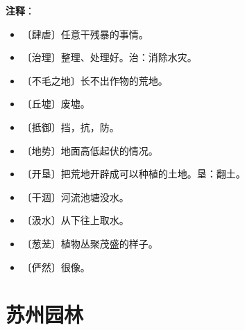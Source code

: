 \documentclass[12pt,UTF-8,openany]{ctexbook}
\begin{document}
\newpage

\textbf{注释}：

\vspace{-1em}

\begin{itemize}
    \setlength\itemsep{-0.2em}
    \item 〔肆虐〕任意干残暴的事情。
    \item 〔治理〕整理、处理好。治：消除水灾。
    \item 〔不毛之地〕长不出作物的荒地。
    \item 〔丘墟〕废墟。
    \item 〔抵御〕挡，抗，防。
    \item 〔地势〕地面高低起伏的情况。
    \item 〔开垦〕把荒地开辟成可以种植的土地。垦：翻土。
    \item 〔干涸〕河流池塘没水。
    \item 〔汲水〕从下往上取水。
    \item 〔葱茏〕植物丛聚茂盛的样子。
    \item 〔俨然〕很像。
\end{itemize}

\chapter{苏州园林}
\end{document}
